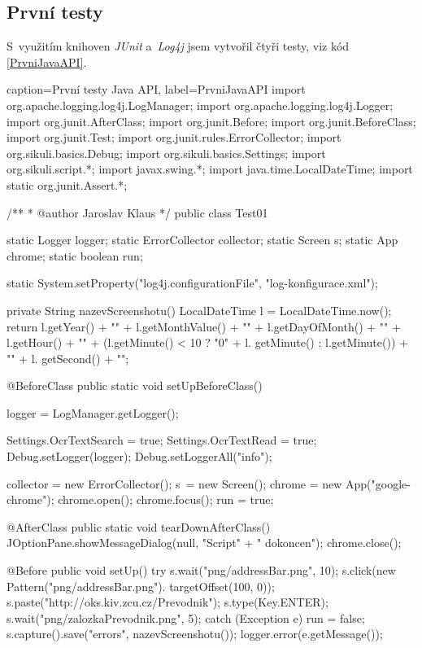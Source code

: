 \documentclass{bakalarka}
\begin{document}
		\subsection{První testy}
		S~využitím knihoven \emph{JUnit} a~\emph{Log4j} jsem vytvořil čtyři testy, viz kód \ref{PrvniJavaAPI}.
		\begin{lstjava}{caption={První testy Java API}, label={PrvniJavaAPI}}
import org.apache.logging.log4j.LogManager;
import org.apache.logging.log4j.Logger;
import org.junit.AfterClass;
import org.junit.Before;
import org.junit.BeforeClass;
import org.junit.Test;
import org.junit.rules.ErrorCollector;
import org.sikuli.basics.Debug;
import org.sikuli.basics.Settings;
import org.sikuli.script.*;
import javax.swing.*;
import java.time.LocalDateTime;
import static org.junit.Assert.*;

/**
 * @author Jaroslav Klaus
 */
public class Test01 {

  static Logger logger;
  static ErrorCollector collector;
  static Screen s;
  static App chrome;
  static boolean run;

  static {
    System.setProperty("log4j.configurationFile",
      "log-konfigurace.xml");
  }

  private String nazevScreenshotu() {
    LocalDateTime l = LocalDateTime.now();
      return l.getYear() + "" + l.getMonthValue() +
        "" + l.getDayOfMonth() + "" + l.getHour() +
        "" + (l.getMinute() < 10 ? "0" + l.
        getMinute() : l.getMinute()) + "" + l.
        getSecond() + "";
  }

  @BeforeClass
  public static void setUpBeforeClass() {
    logger = LogManager.getLogger();

    Settings.OcrTextSearch = true;
    Settings.OcrTextRead = true;
    Debug.setLogger(logger);
    Debug.setLoggerAll("info");

    collector = new ErrorCollector();
    s~= new Screen();
    chrome = new App("google-chrome");
    chrome.open();
    chrome.focus();
    run = true;
    }

  @AfterClass
  public static void tearDownAfterClass() {
    JOptionPane.showMessageDialog(null, "Script" +
      " dokoncen");
    chrome.close();
  }

  @Before
  public void setUp() {
    try {
      s.wait("png/addressBar.png", 10);
      s.click(new Pattern("png/addressBar.png").
        targetOffset(100, 0));
      s.paste("http://oks.kiv.zcu.cz/Prevodnik");
      s.type(Key.ENTER);
      s.wait("png/zalozkaPrevodnik.png", 5);
    } catch (Exception e) {
      run = false;
      s.capture().save("errors", nazevScreenshotu());
      logger.error(e.getMessage());
    }
  }

}
\end{lstjava}
\end{document}
